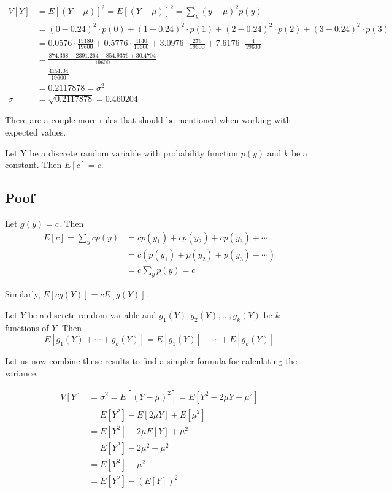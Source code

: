 \documentclass[11pt]{article}
\theoremstyle{definition}
\begin{document}
$$
	\begin{aligned}
		V[Y] & = E[(Y - \mu)]^2 = E[(Y - \mu)]^2 = \sum_y (y-\mu)^2p(y) \\
		& = (0-0.24)^2 \cdot p(0) + (1-0.24)^2 \cdot p(1) + (2-0.24)^2 \cdot p(2) + (3-0.24)^2 \cdot p(3) \\
		& = 0.0576 \cdot \frac{15180}{19600} + 0.5776 \cdot \frac{4140}{19600} + 3.0976 \cdot \frac{276}{19600} + 7.6176 \cdot \frac{4}{19600} \\
		& = \frac{874.368 + 2391.264 + 854.9376 + 30.4704}{19600} \\
		& = \frac{4151.04}{19600} \\
		& = 0.2117878 = \sigma^2 \\
		\sigma & = \sqrt{0.2117878} = 0.460204
	\end{aligned}
$$

There are a couple more rules that should be mentioned when working with expected values.

\begin{shaded}
	Let Y be a discrete random variable with probability function $p(y)$ and $k$ be a constant. Then $E[c] = c$.	
	\subsection*{Poof}
		Let $g(y)=c$. Then
		$$
			\begin{aligned}
				E[c] = \sum_y cp(y) & = cp(y_1) + cp(y_2) + cp(y_3) + \cdots \\
				& = c(p(y_1) + p(y_2) + p(y_3) + \cdots) \\
				& = c \sum_y p(y) = c
			\end{aligned}
		$$	
\end{shaded}

Similarly, $E[cg(Y)] = cE[g(Y)]$.

\begin{shaded}
	Let $Y$ be a discrete random variable and $g_1(Y), g_2(Y), \ldots, g_k(Y)$ be $k$ functions of $Y$. Then
	$$
		E[g_1(Y) + \cdots + g_k(Y)] = E[g_1(Y)] + \cdots + E[g_k(Y)]
	$$
\end{shaded}

Let us now combine these results to find a simpler formula for calculating the variance.

$$
	\begin{aligned}
		V[Y] & = \sigma^2 = E[(Y-\mu)^2] = E[Y^2-2\mu Y+\mu^2] \\
		& = E[Y^2] - E[2\mu Y] + E[\mu^2] \\
		& = E[Y^2] - 2\mu E[Y] + \mu^2 \\
		& = E[Y^2] - 2\mu^2 + \mu^2 \\
		& = E[Y^2] - \mu^2 \\
		& = E[Y^2] - (E[Y])^2
	\end{aligned}
$$
\end{document}
